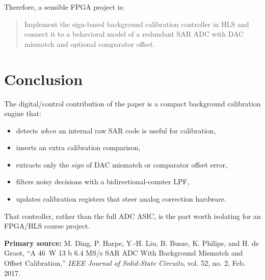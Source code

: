 \documentclass[11pt]{article}
\begin{document}
\noindent Therefore, a sensible FPGA project is:
\begin{quote}
Implement the sign-based background calibration controller in HLS and connect it to a behavioral model of a redundant SAR ADC with DAC mismatch and optional comparator offset.
\end{quote}

\section*{Conclusion}
The digital/control contribution of the paper is a compact background calibration engine that:
\begin{itemize}
    \item detects \emph{when} an internal raw SAR code is useful for calibration,
    \item inserts an extra calibration comparison,
    \item extracts only the \emph{sign} of DAC mismatch or comparator offset error,
    \item filters noisy decisions with a bidirectional-counter LPF,
    \item updates calibration registers that steer analog correction hardware.
\end{itemize}

\noindent That controller, rather than the full ADC ASIC, is the part worth isolating for an FPGA/HLS course project.

\vfill
\noindent\textbf{Primary source:}
M. Ding, P. Harpe, Y.-H. Liu, B. Busze, K. Philips, and H. de Groot, ``A 46~\textmu W 13 b 6.4 MS/s SAR ADC With Background Mismatch and Offset Calibration,'' \emph{IEEE Journal of Solid-State Circuits}, vol. 52, no. 2, Feb. 2017.
\end{document}
